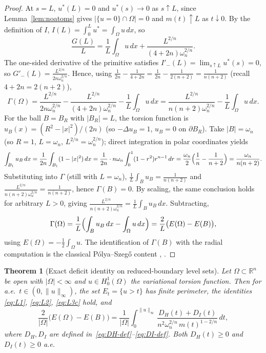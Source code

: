 \documentclass[11pt]{article}
\newtheorem{theorem}{Theorem}[section]
\theoremstyle{definition}
\newcommand{\R}{\mathbb{R}}
\newcommand{\Om}{\Omega}
\begin{document}
\begin{proof}
At $s=L$, $u^{*}(L)=0$ and $u^*(s)\to0$ as $s\uparrow L$, since
Lemma~\ref{lem:noatoms} gives $|\{u=0\}\cap\Om|=0$ and
$m(t)\uparrow L$ as $t\downarrow0$. By the definition of $I$,
$I(L)=\int_{0}^{L}u^{*}=\int_{\Om}u\,dx$, so
\[
   \frac{G(L)}{L}=\frac{1}{L}\int_{\Om}u\,dx
                  +\frac{L^{2/n}}{(4+2n)\omega_{n}^{2/n}}.
\]
The one-sided derivative of the primitive satisfies
$I'_{-}(L)=\lim_{s\uparrow L}u^*(s)=0$, so
$G'_{-}(L)=
\frac{L^{2/n}}{2n\omega_{n}^{2/n}}$. Hence, using
$\frac{1}{2n}-\frac{1}{4+2n}=\frac{1}{2n}-\frac{1}{2(n+2)}
 =\frac{1}{n(n+2)}$ (recall $4+2n=2(n+2)$),
\[
   \Gamma(\Om)
   =\frac{L^{2/n}}{2n\omega_{n}^{2/n}}
    -\frac{L^{2/n}}{(4+2n)\omega_{n}^{2/n}}
    -\frac{1}{L}\int_{\Om}u\,dx
   =\frac{L^{2/n}}{n(n+2)\omega_{n}^{2/n}}-\frac{1}{L}\int_{\Om}u\,dx.
\]
For the ball $B=B_{R}$ with $|B_{R}|=L$, the torsion function is
$u_{B}(x)=(R^{2}-|x|^{2})/(2n)$ (so $-\Delta u_{B}=1$, $u_{B}=0$ on
$\partial B_{R}$). Take $|B|=\omega_{n}$ (so $R=1$, $L=\omega_{n}$,
$L^{2/n}=\omega_{n}^{2/n}$); direct integration in polar coordinates
yields
\[
   \int_{B_{1}}u_{B}\,dx
   =\frac{1}{2n}\int_{B_{1}}(1-|x|^{2})\,dx
   =\frac{1}{2n}\cdot n\omega_{n}\int_{0}^{1}(1-r^{2})r^{n-1}\,dr
   =\frac{\omega_{n}}{2}\Bigl(\frac1n-\frac1{n+2}\Bigr)
   =\frac{\omega_{n}}{n(n+2)}.
\]
Substituting into $\Gamma$ (still with $L=\omega_{n}$),
$\frac{1}{L}\int_{B}u_{B}=\frac{1}{n(n+2)}$ and
$\frac{L^{2/n}}{n(n+2)\omega_{n}^{2/n}}=\frac{1}{n(n+2)}$, hence
$\Gamma(B)=0$. By scaling, the same conclusion holds for arbitrary
$L>0$, giving
$\frac{L^{2/n}}{n(n+2)\omega_{n}^{2/n}}=\frac{1}{L}\int_{B}u_{B}\,dx$.
Subtracting,
\[
   \Gamma(\Om)
   =\frac{1}{L}\Bigl(\int_{B}u_{B}\,dx-\int_{\Om}u\,dx\Bigr)
   =\frac{2}{L}\bigl(E(\Om)-E(B)\bigr),
\]
using $E(\Om)=-\tfrac12\int_{\Om}u$. The identification of $\Gamma(B)$
with the radial computation is the classical P\'olya--Szeg\H{o} content
\cite{PolyaSzego1951}, \cite[\S II.5]{Bandle1980}.
\end{proof}

\begin{theorem}[Exact deficit identity on reduced-boundary level sets]
\label{thm:main}
Let $\Om\subset\R^{n}$ be open with $|\Om|<\infty$ and $u\in H^{1}_{0}(\Om)$
the variational torsion function. Then for a.e.\ $t\in(0,\|u\|_{\infty})$,
the set $E_{t}=\{u>t\}$ has finite perimeter, the identities
\eqref{eq:L1}, \eqref{eq:L2}, \eqref{eq:L3c} hold, and
\begin{equation}\label{eq:main}
   \boxed{\;
   \frac{2}{|\Om|}\bigl(E(\Om)-E(B)\bigr)
   =\frac{1}{|\Om|}\int_{0}^{\|u\|_{\infty}}
     \frac{D_{H}(t)+D_{I}(t)}{n^{2}\omega_{n}^{2/n}\,m(t)^{1-2/n}}\,dt,\;}
\end{equation}
where $D_{H},D_{I}$ are defined in~\eqref{eq:DH-def}--\eqref{eq:DI-def}.
Both $D_{H}(t)\ge 0$ and $D_{I}(t)\ge 0$ a.e.
\end{theorem}
\end{document}
